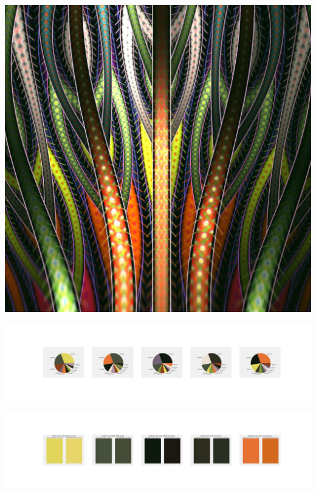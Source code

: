 \documentclass[11pt]{article}
\begin{document}
\begin{landscape}
    \begin{center}
    \includegraphics[width=\textwidth]{./nbimg/file (260).jpg}
    \end{center}

    \begin{center}
    \includegraphics[width=250mm]{./nbimg/pie-179.jpg}
    \end{center}

    \begin{center}
    \includegraphics[width=250mm]{./nbimg/peak-179.jpg}
    \end{center}
    


\end{landscape}
\end{document}
